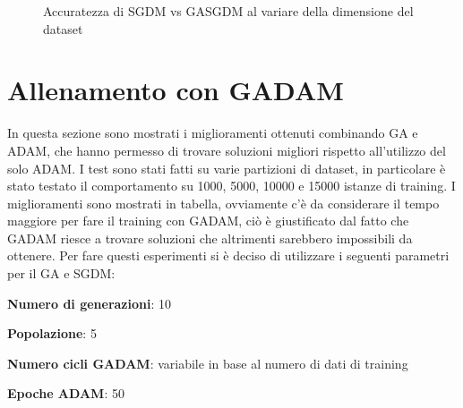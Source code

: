 \begin{figure}[htbp]
    \centering
    \caption{Accuratezza di SGDM vs GASGDM al variare della dimensione del dataset}
    \end{figure}
    
\section{Allenamento con GADAM}
    In questa sezione sono mostrati i miglioramenti ottenuti combinando GA e ADAM, che hanno permesso di trovare soluzioni migliori rispetto all’utilizzo del solo ADAM. I test sono stati fatti su 
    varie partizioni di dataset, in particolare è stato testato il comportamento su 1000, 5000, 10000 e 15000 istanze di training.
    I miglioramenti sono mostrati in tabella, ovviamente c'è da considerare il tempo maggiore per fare il training con GADAM, ciò è giustificato dal fatto che GADAM riesce a trovare soluzioni che altrimenti sarebbero impossibili da ottenere.
    Per fare questi esperimenti si è deciso di utilizzare i seguenti parametri per il GA e SGDM:
    \begin{compactitemize}
        \item \textbf{Numero di generazioni}: 10
        \item \textbf{Popolazione}: 5
        \item \textbf{Numero cicli GADAM}: variabile in base al numero di dati di training
        \item \textbf{Epoche ADAM}: 50
    \end{compactitemize}

